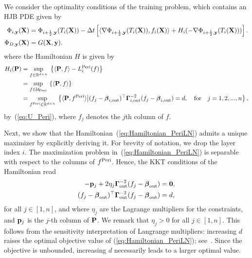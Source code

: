 \documentclass[journal]{IEEEtran}
\def\eqref#1{equation~\ref{#1}}
\newcommand{\bfP}{{\bf P}}
\newcommand{\bfX}{{\bf X}}
\newcommand{\bfy}{ {\bf y}}
\newcommand{\bfp}{{\bf p}}
\newcommand{\bfGamma}{{\boldsymbol \Gamma}}
\newcommand{\bfbeta}{{\boldsymbol \beta}}
\renewcommand{\eqref}[1]{(\ref{#1})}
\theoremstyle{plain}
\theoremstyle{definition}
\theoremstyle{remark}
\begin{document}
We consider the optimality conditions of the training problem, which contains an HJB PDE given by 
\begin{align}
\begin{split}
    \Phi_{i,\bfy}(\bfX) 
    &= \Phi_{i+\frac{1}{2},\bfy}(T_i(\bfX)) - \Delta t\left[ \langle \nabla \Phi_{{i+\frac{1}{2}, \bfy}}(T_i(\bfX)), f_i(\bfX) \rangle + H_i(- \nabla \Phi_{{i+\frac{1}{2}, \bfy}}(T_i(\bfX))) \right]. \\
    \Phi_{D,\bfy}(\bfX) &=G(\bfX, \bfy).
    \end{split}
\end{align}
where the Hamiltonian $H$ is given by
\begin{align}
    H_i(\bfP) &= \sup_{f \in \mathbb{R}^{d \times n}} \;\left\{ \langle \bfP, f \rangle - L_i^{\rm Peri}(f) \right\} \\
    &= \sup_{f \in \mathcal{U}_{\rm Peri}} \;\left\{ \langle \bfP, f \rangle \right\}  \\
    &= \sup_{f^{\rm Peri}\in \mathbb{R}^{d \times n}} \; \left\{ \langle \bfP, f^{\rm Peri} \rangle \middle| (f_j - \bfbeta_{i, \rm out})^\top \bfGamma_{i, \rm out}^{-2} (f_j - \bfbeta_{i, \rm out}) = d, \quad \text{for} \quad j=1,2,...,n \right\}, \label{eq:Hamiltonian_PeriLN}
\end{align}
by~\eqref{eq:U_Peri}, where $f_j$ denotes the $j$th column of $f$. 

Next, we show that the Hamiltonian~(\ref{eq:Hamiltonian_PeriLN}) admits a unique maximizer by explicitly deriving it. For brevity of notation, we drop the layer index $i$.
The maximization problem in~(\ref{eq:Hamiltonian_PeriLN}) is separable with respect to the columns of $f^{\rm Peri}$. 
Hence, the KKT conditions of the Hamiltonian read
\begin{align}
     -\bfp_j + 2\eta_j \bfGamma_{\rm out}^{-2} (f_j-\bfbeta_{\rm out})&= {\bf 0}, \label{eq:LN_noRun_KKT1} \\
    (f_j - \bfbeta_{\rm out})^\top \bfGamma_{\rm out}^{-2} (f_j - \bfbeta_{\rm out}) & = d,\label{eq:LN_noRun_KKT2}
\end{align}
for all $j\in[1,n]$, and where $\eta_j$ are the Lagrange multipliers for the constraints, and $\bfp_j$ is the $j$-th column of $\bfP$. We remark that $\eta_j > 0$ for all $j\in[1,n]$. This follows from the sensitivity interpretation of Langrange multipliers: increasing $d$ raises the optimal objective value of (\ref{eq:Hamiltonian_PeriLN}); see~\cite[Section~12.8]{nocedal2006numerical}. Since the objective is unbounded, increasing $d$ necessarily leads to a larger optimal value.
\end{document}
